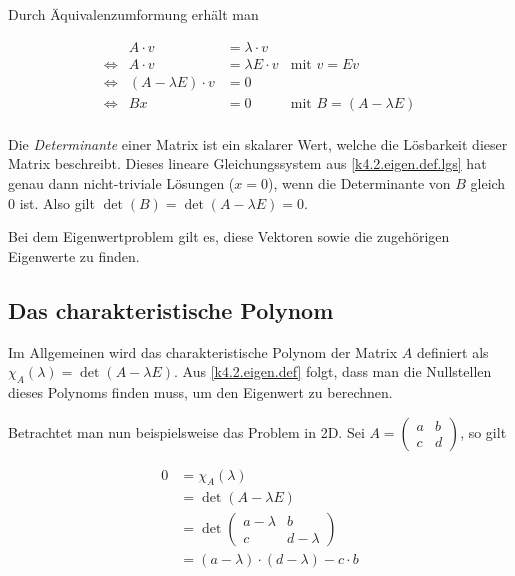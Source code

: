 \documentclass[]{dsadokumentation}
\begin{document}
Durch Äquivalenzumformung erhält man

\begin{equation}
  \label{k4.2.eigen.def.lgs}
  \begin{aligned}
     &                 & A \cdot v               & = \lambda \cdot v   &                                 & \\
     & \Leftrightarrow & A \cdot v               & = \lambda E \cdot v & \text{mit } v = Ev              & \\
     & \Leftrightarrow & (A - \lambda E) \cdot v & = 0                 &                                 & \\
     & \Leftrightarrow & Bx                      & = 0  \quad \quad    & \text{mit } B = (A - \lambda E) & \\
  \end{aligned}
\end{equation}

Die \textit{Determinante} einer Matrix ist ein skalarer Wert, welche die Lösbarkeit dieser Matrix beschreibt. Dieses lineare Gleichungssystem aus \cref{k4.2.eigen.def.lgs} hat genau dann nicht-triviale Lösungen ($x = 0$), wenn die Determinante von $B$ gleich $0$ ist. Also gilt $\det (B) = \det (A - \lambda E) = 0$.

Bei dem Eigenwertproblem gilt es, diese Vektoren sowie die zugehörigen Eigenwerte zu finden.


\subsection{Das charakteristische Polynom}

Im Allgemeinen wird das charakteristische Polynom der Matrix $A$ definiert als $\chi_A (\lambda) = \det(A - \lambda E)$. Aus \cref{k4.2.eigen.def} folgt, dass man die Nullstellen dieses Polynoms finden muss, um den Eigenwert zu berechnen.

Betrachtet man nun beispielsweise das Problem in 2D. Sei $A = \begin{pmatrix}
    a & b \\
    c & d
  \end{pmatrix}$, so gilt

\begin{equation}
  \label{k4.2.eigen.charac.2d}
  \begin{aligned}
    0
     & = \chi_A (\lambda)                              \\
     & = \det(A - \lambda E)                           \\
     & = \det \begin{pmatrix}
                a - \lambda & b         \\
                c           & d-\lambda
              \end{pmatrix}                  \\
     & = (a - \lambda) \cdot (d - \lambda) - c \cdot b
  \end{aligned}
\end{equation}
\end{document}
